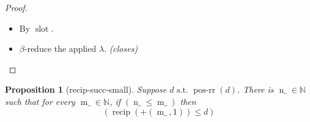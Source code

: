 \documentclass[11pt]{article}
\theoremstyle{plain}
\newtheorem{proposition}{Proposition}
\begin{document}
\begin{proof}
\begin{itemize}[leftmargin=2.8em, itemsep=4pt, parsep=1pt]
  \item[\textbf{4}] By $\operatorname{slot}$.
  \item[\textbf{5--6}] $\beta$-reduce the applied $\lambda$.  \emph{(closes)}
\end{itemize}
\end{proof}

\bigskip

\begin{proposition}[recip-succ-small]
Suppose $d \text{ s.t. } \operatorname{pos\text{-}rr}(d)$. There is $\operatorname{n\_} \in \mathbb{N}$ such that for every $\operatorname{m\_} \in \mathbb{N}$, if $(\operatorname{n\_} \leq \operatorname{m\_})$ then 
\begin{equation*}
(\operatorname{recip}(+(\operatorname{m\_}, 1)) \leq d)
\end{equation*}

\end{proposition}
\end{document}
